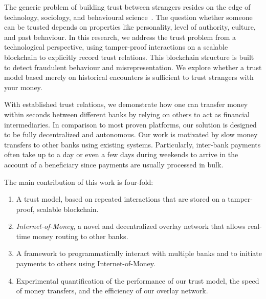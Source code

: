 The generic problem of building trust between strangers resides on the edge of technology, sociology, and behavioural science~\cite{yan2008trust}.
The question whether someone can be trusted depends on properties like personality, level of authority, culture, and past behaviour. %
In this research, we address the trust problem from a technological perspective, using tamper-proof interactions on a scalable blockchain to explicitly record trust relations.
This blockchain structure is built to detect fraudulent behaviour and misrepresentation.
We explore whether a trust model based merely on historical encounters is sufficient to trust strangers with your money.

With established trust relations, we demonstrate how one can transfer money within seconds between different banks by relying on others to act as financial intermediaries.
In comparison to most proven platforms, our solution is designed to be fully decentralized and autonomous. %
Our work is motivated by slow money transfers to other banks using existing systems. %
Particularly, inter-bank payments often take up to a day or even a few days during weekends to arrive in the account of a beneficiary since payments are usually processed in bulk.

The main contribution of this work is four-fold:
\begin{enumerate}
	\item A trust model, based on repeated interactions that are stored on a tamper-proof, scalable blockchain.
	\item \emph{Internet-of-Money}, a novel and decentralized overlay network that allows real-time money routing to other banks.
	\item A framework to programmatically interact with multiple banks and to initiate payments to others using Internet-of-Money.
	\item Experimental quantification of the performance of our trust model, the speed of money transfers, and the efficiency of our overlay network.
\end{enumerate}

